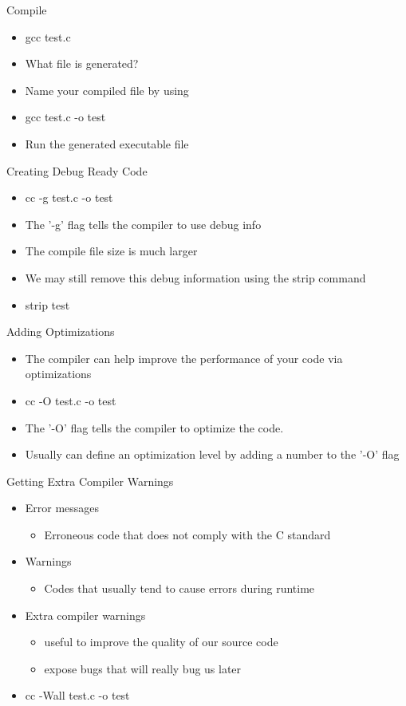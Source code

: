 \documentclass{beamer}
\begin{document}
\begin{frame}{Compile}
\begin{itemize}
\item gcc test.c 
\item What file is generated?
\item Name your compiled file by using
\item gcc test.c -o test
\item Run the generated executable file
\end{itemize}
\end{frame}

\begin{frame}{Creating Debug Ready Code}
\begin{itemize}
\item cc -g test.c -o test
\item The '-g' flag tells the compiler to use debug info
\item The compile file size is much larger
\item We may still remove this debug information using the strip command 
\item strip test
\end{itemize}
\end{frame}

\begin{frame}{Adding Optimizations}
\begin{itemize}
\item The compiler can help improve the performance of your code via optimizations
\item cc -O test.c -o test
\item The '-O' flag tells the compiler to optimize the code. 
\item Usually can define an optimization level by adding a number to the '-O' flag
\end{itemize}
\end{frame}

\begin{frame}{Getting Extra Compiler Warnings}
\begin{itemize}
\item Error messages
\begin{itemize}
\item Erroneous code that does not comply with the C standard 
\end{itemize}
\item Warnings 
\begin{itemize}
\item Codes that usually tend to cause errors during runtime 
\end{itemize}
\item Extra compiler warnings 
\begin{itemize}
\item useful to improve the quality of our source code
\item expose bugs that will really bug us later  
\end{itemize}
\item cc -Wall test.c -o test
\end{itemize}
\end{frame}
\end{document}
